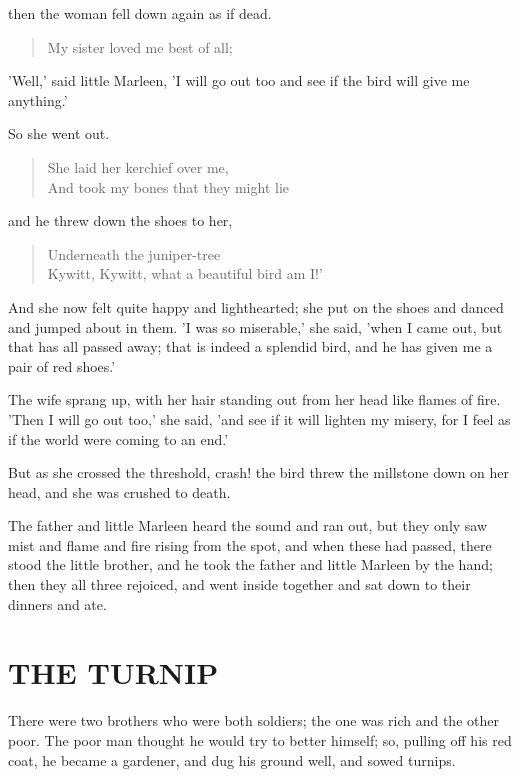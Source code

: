 \documentclass[12pt]{book}
\begin{document}
then the woman fell down again as if dead.

\begin{verse}
  My sister loved me best of all;
\end{verse}

'Well,' said little Marleen, 'I will go out too and see if the bird
will give me anything.'

So she went out.

\begin{verse}
  She laid her kerchief over me,\\
  And took my bones that they might lie
\end{verse}

and he threw down the shoes to her,

\begin{verse}
  Underneath the juniper-tree\\
  Kywitt, Kywitt, what a beautiful bird am I!'
\end{verse}

And she now felt quite happy and lighthearted; she put on the shoes
and danced and jumped about in them. 'I was so miserable,' she said,
'when I came out, but that has all passed away; that is indeed a
splendid bird, and he has given me a pair of red shoes.'

The wife sprang up, with her hair standing out from her head like
flames of fire. 'Then I will go out too,' she said, 'and see if it
will lighten my misery, for I feel as if the world were coming to an
end.'

But as she crossed the threshold, crash! the bird threw the millstone
down on her head, and she was crushed to death.

The father and little Marleen heard the sound and ran out, but they
only saw mist and flame and fire rising from the spot, and when these
had passed, there stood the little brother, and he took the father and
little Marleen by the hand; then they all three rejoiced, and went
inside together and sat down to their dinners and ate.



\chapter{THE TURNIP}

There were two brothers who were both soldiers; the one was rich and
the other poor. The poor man thought he would try to better himself;
so, pulling off his red coat, he became a gardener, and dug his ground
well, and sowed turnips.
\end{document}
